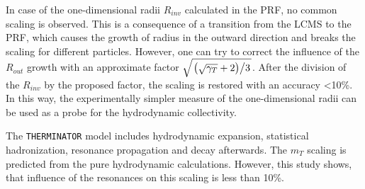   In case of the one-dimensional radii $R_{inv}$ calculated in the PRF, no common scaling is observed.
  This is a consequence of a transition from the LCMS to the PRF, which causes the growth of radius in the outward direction and breaks the scaling for different particles.
  However, one can try to correct the influence of the $R_{out}$ growth with an approximate factor $\sqrt{ \left. \left( \sqrt{\gamma_T} + 2 \right) \middle/ 3 \right. }$.
  After the division of the $R_{inv}$ by the proposed factor, the scaling is restored with an accuracy <10\%.
  In this way, the experimentally simpler measure of the one-dimensional radii can be used as a probe for the hydrodynamic collectivity.

  The \verb|THERMINATOR| model includes hydrodynamic expansion, statistical hadronization, resonance propagation and decay afterwards.
  The $m_T$ scaling is predicted from the pure hydrodynamic calculations.
  However, this study shows, that influence of the resonances on this scaling is less than 10\%.